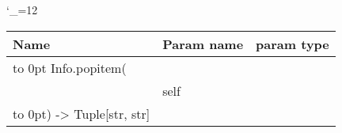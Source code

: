 \begingroup \catcode`\_=12 \tt
\begin{tabular}{lll}
\toprule
\textrm{Name}&\textrm{Param name}&\textrm{param type}\\
\midrule
\hbox to 0pt {Info.popitem(\hss}\\
& self\\
\hbox to 0pt{) -> Tuple[str, str]\hss}\\
\bottomrule
\end{tabular}
\endgroup
